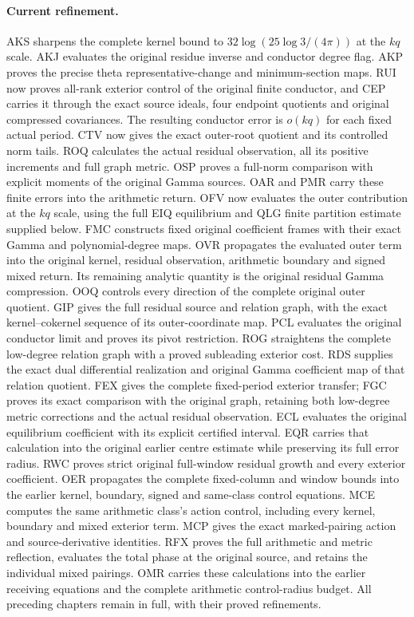 \documentclass[11pt,a4paper]{article}
\begin{document}
\paragraph{Current refinement.}
AKS sharpens the complete kernel bound to
$32\log(25\log3/(4\pi))$ at the $kq$ scale. AKJ evaluates the
original residue inverse and conductor degree flag. AKP proves the
precise theta representative-change and minimum-section maps.
RUI now proves all-rank exterior control of the original finite
conductor, and CEP carries it through the exact source ideals,
four endpoint quotients and original compressed covariances.
The resulting conductor error is $o(kq)$ for each fixed actual period.
CTV now gives the exact outer-root quotient and its controlled
norm tails. ROQ calculates the actual residual observation, all its
positive increments and full graph metric. OSP proves a full-norm
comparison with explicit moments of the original Gamma sources.
OAR and PMR carry these finite errors into the arithmetic return.
OFV now evaluates the outer contribution at the $kq$ scale, using
the full EIQ equilibrium and QLG finite partition estimate supplied
below. FMC constructs fixed original coefficient frames with their
exact Gamma and polynomial-degree maps. OVR propagates the evaluated
outer term into the original kernel, residual observation, arithmetic
boundary and signed mixed return. Its remaining analytic quantity is
the original residual Gamma compression.
OOQ controls every direction of the complete original outer quotient.
GIP gives the full residual source and relation graph, with the exact
kernel--cokernel sequence of its outer-coordinate map. PCL evaluates
the original conductor limit and proves its pivot restriction.
ROG straightens the complete low-degree relation graph with a proved
subleading exterior cost. RDS supplies the exact dual differential
realization and original Gamma coefficient map of that relation quotient.
FEX gives the complete fixed-period exterior transfer; FGC proves its
exact comparison with the original graph, retaining both low-degree
metric corrections and the actual residual observation. ECL evaluates
the original equilibrium coefficient with its explicit certified interval.
EQR carries that calculation into the original earlier centre estimate
while preserving its full error radius. RWC proves strict original
full-window residual growth and every exterior coefficient. OER
propagates the complete fixed-column and window bounds into the
earlier kernel, boundary, signed and same-class control equations.
MCE computes the same arithmetic class's action control, including
every kernel, boundary and mixed exterior term. MCP gives the exact
marked-pairing action and source-derivative identities. RFX proves the
full arithmetic and metric reflection, evaluates the total phase at
the original source, and retains the individual mixed pairings.
OMR carries these calculations into the earlier receiving equations
and the complete arithmetic control-radius budget.
All preceding chapters remain in full, with their proved refinements.
\tableofcontents
\clearpage
\end{document}

